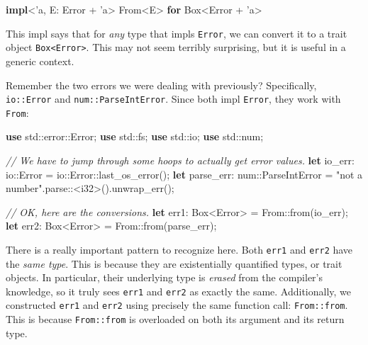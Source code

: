 \documentclass[a4paper,]{book}
\newenvironment{Shaded}{\begin{snugshade}}{\end{snugshade}}
\newcommand{\KeywordTok}[1]{\textcolor[rgb]{0.13,0.29,0.53}{\textbf{{#1}}}}
\newcommand{\DataTypeTok}[1]{\textcolor[rgb]{0.13,0.29,0.53}{{#1}}}
\newcommand{\StringTok}[1]{\textcolor[rgb]{0.31,0.60,0.02}{{#1}}}
\newcommand{\CommentTok}[1]{\textcolor[rgb]{0.56,0.35,0.01}{\textit{{#1}}}}
\newcommand{\OtherTok}[1]{\textcolor[rgb]{0.56,0.35,0.01}{{#1}}}
\newcommand{\NormalTok}[1]{{#1}}
\begin{document}
\begin{Shaded}
\begin{Highlighting}[]
\KeywordTok{impl}\NormalTok{<}\OtherTok{'a}\NormalTok{, E: Error + }\OtherTok{'a}\NormalTok{> From<E> }\KeywordTok{for} \DataTypeTok{Box}\NormalTok{<Error + }\OtherTok{'a}\NormalTok{>}
\end{Highlighting}
\end{Shaded}

This impl says that for \emph{any} type that impls \texttt{Error}, we
can convert it to a trait object
\texttt{Box\textless{}Error\textgreater{}}. This may not seem terribly
surprising, but it is useful in a generic context.

Remember the two errors we were dealing with previously? Specifically,
\texttt{io::Error} and \texttt{num::ParseIntError}. Since both impl
\texttt{Error}, they work with \texttt{From}:

\begin{Shaded}
\begin{Highlighting}[]
\KeywordTok{use} \NormalTok{std::error::Error;}
\KeywordTok{use} \NormalTok{std::fs;}
\KeywordTok{use} \NormalTok{std::io;}
\KeywordTok{use} \NormalTok{std::num;}

\CommentTok{// We have to jump through some hoops to actually get error values.}
\KeywordTok{let} \NormalTok{io_err: io::Error = io::Error::last_os_error();}
\KeywordTok{let} \NormalTok{parse_err: num::ParseIntError = }\StringTok{"not a number"}\NormalTok{.parse::<}\DataTypeTok{i32}\NormalTok{>().unwrap_err();}

\CommentTok{// OK, here are the conversions.}
\KeywordTok{let} \NormalTok{err1: }\DataTypeTok{Box}\NormalTok{<Error> = From::from(io_err);}
\KeywordTok{let} \NormalTok{err2: }\DataTypeTok{Box}\NormalTok{<Error> = From::from(parse_err);}
\end{Highlighting}
\end{Shaded}

There is a really important pattern to recognize here. Both
\texttt{err1} and \texttt{err2} have the \emph{same type}. This is
because they are existentially quantified types, or trait objects. In
particular, their underlying type is \emph{erased} from the compiler's
knowledge, so it truly sees \texttt{err1} and \texttt{err2} as exactly
the same. Additionally, we constructed \texttt{err1} and \texttt{err2}
using precisely the same function call: \texttt{From::from}. This is
because \texttt{From::from} is overloaded on both its argument and its
return type.
\end{document}
